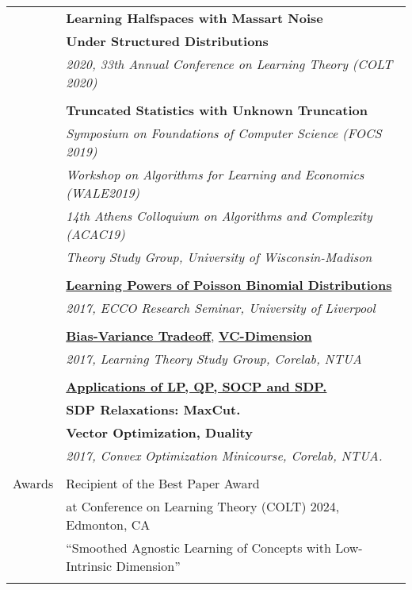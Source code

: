 \documentclass[letterpaper,11pt,oneside]{article}
\begin{document}
\begin{longtable}{@{} l l}
     &\textbf{Learning Halfspaces with Massart Noise}\\
     &\textbf{Under Structured Distributions}\\
     & \emph{2020, 33th Annual Conference on Learning Theory (COLT 2020) } \\
     & \\

 &\textbf{Truncated Statistics with Unknown Truncation}\\
 &\emph{Symposium on Foundations of Computer Science (FOCS 2019)}\\
 &\emph{Workshop on Algorithms for Learning and Economics (WALE2019)}\\
 &\emph{14th Athens Colloquium on Algorithms and Complexity (ACAC19)}\\
 &\emph{Theory Study Group, University of Wisconsin-Madison}\\
 &\\

 &\href{https://vkonton.github.io/assets/talks/pbdPowers.pdf}
 {\textbf{Learning Powers of Poisson Binomial Distributions}}\\
 &\emph{2017, ECCO Research Seminar, University of Liverpool} \\
&\\

  &\href{https://vkonton.github.io/assets/talks/learning1.pdf}{\textbf{Bias-Variance Tradeoff}},
  \href{https://vkonton.github.io/assets/talks/learning2.pdf}{\textbf{VC-Dimension}}\\
  &\emph{2017, Learning Theory Study Group, Corelab, NTUA}\\
  &\\

  &\href{https://vkonton.github.io/talks/}{\textbf{Applications of LP, QP, SOCP and SDP.}}\\
  &\textbf{SDP Relaxations: MaxCut.}\\
  &\textbf{Vector Optimization, Duality} \\
  &\emph{2017, Convex Optimization Minicourse, Corelab, NTUA.}\\
  &\\



 \Large{Awards}
 & Recipient of the Best Paper Award \\ 
 & at Conference on Learning Theory (COLT) 2024, Edmonton, CA \\ 
 & ``Smoothed Agnostic Learning of Concepts with Low-Intrinsic Dimension''\\
 & \\


\end{longtable}
\end{document}
